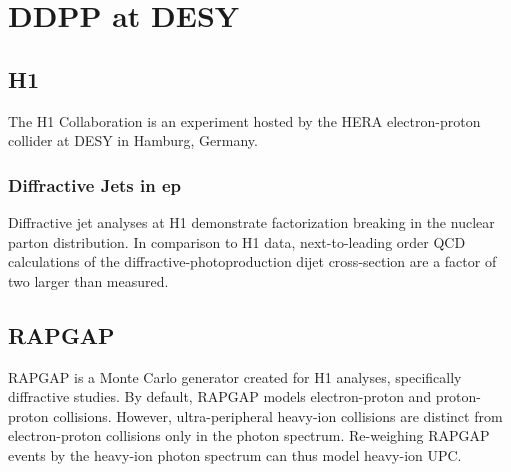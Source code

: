 
\chapter{DDPP at DESY}

\section{H1}

The H1 Collaboration is an experiment hosted by the HERA electron-proton collider at DESY in Hamburg, Germany. 

\subsection{Diffractive Jets in ep}

Diffractive jet analyses at H1 demonstrate factorization breaking in the nuclear parton distribution. In comparison to H1 data, next-to-leading order QCD calculations of the diffractive-photoproduction dijet cross-section are a factor of two larger than measured. 

\section{RAPGAP}

RAPGAP is a Monte Carlo generator created for H1 analyses, specifically diffractive studies. By default, RAPGAP models electron-proton and proton-proton collisions. However, ultra-peripheral heavy-ion collisions are distinct from electron-proton collisions only in the photon spectrum. Re-weighing RAPGAP events by the heavy-ion photon spectrum can thus model heavy-ion UPC. 